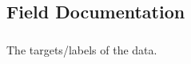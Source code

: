 \subsection{Field Documentation}
\hypertarget{classpeopleDetector_a511ae0b1c13f95e5f08f1a0dd3da3d93}{
\subsubsection[{data}]{}}
\label{classpeopleDetector_a511ae0b1c13f95e5f08f1a0dd3da3d93}
The targets/labels of the data. 